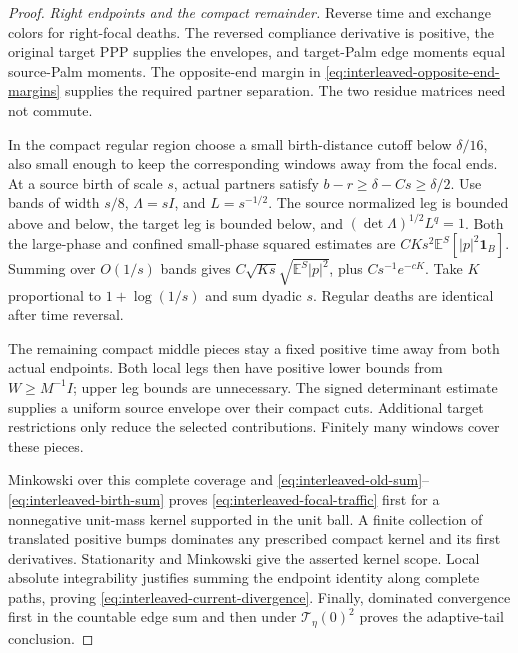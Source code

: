 \documentclass[11pt,reqno]{amsart}
\theoremstyle{definition}
\theoremstyle{remark}
\numberwithin{equation}{section}
\newcommand{\E}{\mathbb E}
\begin{document}
\begin{proof}
\emph{Right endpoints and the compact remainder.}
Reverse time and exchange colors for right-focal deaths. The reversed
compliance derivative is positive, the original target PPP supplies
the envelopes, and target-Palm edge moments equal source-Palm moments.
The opposite-end margin in
\eqref{eq:interleaved-opposite-end-margins} supplies the required
partner separation. The two residue matrices need not commute.

In the compact regular region choose a small birth-distance cutoff
below \(\delta/16\), also small enough to keep the corresponding
windows away from the focal ends. At a source birth of scale \(s\),
actual partners satisfy \(b-r\ge\delta-Cs\ge\delta/2\).
Use bands of width \(s/8\), \(\Lambda=sI\), and \(L=s^{-1/2}\).
The source normalized leg is bounded above and below, the target
leg is bounded below, and \((\det\Lambda)^{1/2}L^q=1\).
Both the large-phase and confined small-phase squared estimates are
\(CKs^2\E^S[|p|^2\mathbf1_B]\). Summing over \(O(1/s)\) bands
gives \(C\sqrt{Ks}\sqrt{\E^S|p|^2}\), plus
\(Cs^{-1}e^{-cK}\). Take \(K\) proportional to
\(1+\log(1/s)\) and sum dyadic \(s\). Regular deaths are identical
after time reversal.

The remaining compact middle pieces stay a fixed positive time away
from both actual endpoints. Both local legs then have positive lower
bounds from \(W\ge M^{-1}I\); upper leg bounds are unnecessary.
The signed determinant estimate supplies a uniform source envelope
over their compact cuts. Additional target restrictions only reduce
the selected contributions. Finitely many windows cover these pieces.

Minkowski over this complete coverage and
\eqref{eq:interleaved-old-sum}--\eqref{eq:interleaved-birth-sum}
proves \eqref{eq:interleaved-focal-traffic} first for a nonnegative
unit-mass kernel supported in the unit ball. A finite collection of
translated positive bumps dominates any prescribed compact kernel and
its first derivatives. Stationarity and Minkowski give the asserted
kernel scope. Local absolute integrability justifies summing the
endpoint identity along complete paths, proving
\eqref{eq:interleaved-current-divergence}. Finally, dominated convergence
first in the countable edge sum and then under
\(\mathcal T_\eta(0)^2\) proves the adaptive-tail conclusion.
\end{proof}
\end{document}
